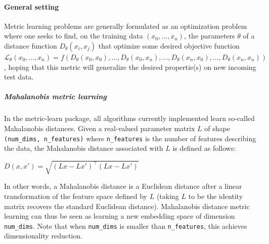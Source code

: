 \documentclass[twoside,11pt]{article}
\begin{document}


\paragraph{General setting} Metric learning problems are generally formulated as an optimization problem where one seeks to find, on the training data $(x_0, ..., x_n)$, the parameters $\theta$ of a distance function $D_\theta(x_i, x_j)$ that optimize some desired objective function $\mathcal{L}_\theta(x_0, ..., x_n) = f(D_\theta(x_0, x_0), ..., D_\theta(x_0, x_n), ..., D_\theta(x_n, x_0), ..., D_\theta(x_n, x_n))$, hoping that this metric will generalize the desired propertie(s) on new incoming test data.

\subparagraph{Mahalanobis metric learning}

In the metric-learn package, all algorithms currently implemented learn so-called Mahalanobis distances. Given a real-valued parameter matrix $L$ of shape \texttt{(num\_dims, n\_features)} where \texttt{n\_features} is the
number of features describing the data, the Mahalanobis distance associated with
$L$ is defined as follows:

$D(x, x') = \sqrt{(Lx-Lx')^\top(Lx-Lx')}$

In other words, a Mahalanobis distance is a Euclidean distance after a
linear transformation of the feature space defined by $L$ (taking
$L$ to be the identity matrix recovers the standard Euclidean distance).
Mahalanobis distance metric learning can thus be seen as learning a new
embedding space of dimension \texttt{num\_dims}. Note that when \texttt{num\_dims} is
smaller than \texttt{n\_features}, this achieves dimensionality reduction.




\end{document}
